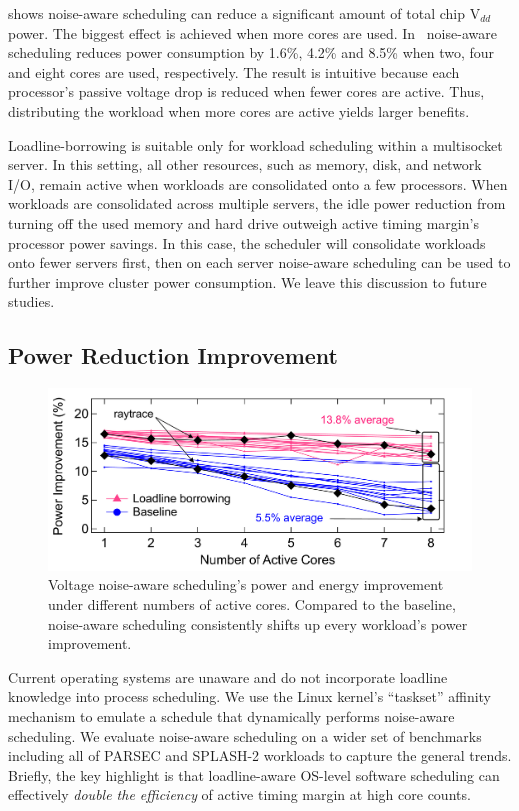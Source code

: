  shows noise-aware scheduling can reduce a significant amount of total chip V$_{dd}$ power. The biggest effect is achieved when more cores are used. In~ noise-aware scheduling reduces power consumption by 1.6\%, 4.2\% and 8.5\% when two, four and eight cores are used, respectively. The result is intuitive because each processor's passive voltage drop is reduced when fewer cores are active. Thus, distributing the workload when more cores are active yields larger benefits. 

Loadline-borrowing is suitable only for workload scheduling within a multisocket server. In this setting, all other resources, such as memory, disk, and network I/O, remain active when workloads are consolidated onto a few processors. When workloads are consolidated across multiple servers, the idle power reduction from turning off the used memory and hard drive outweigh active timing margin's processor power savings. In this case, the scheduler will consolidate workloads onto fewer servers first, then on each server noise-aware scheduling can be used to further improve cluster power consumption. We leave this discussion to future studies.

\subsection{Power Reduction Improvement}
\label{sec:voltage:opt:result}

\begin{figure}[t]
\centering
    \includegraphics[trim=0 0 0 0, clip,width=0.8\linewidth]{graphs/voltage/loadline-borrowing_scale.pdf}
    \caption{Voltage noise-aware scheduling's power and energy improvement under different numbers of active cores. Compared to the baseline, noise-aware scheduling consistently shifts up every workload's power improvement.}
    \label{fig:ll-borrow-scale}
    \vspace{-0.2cm}
\end{figure}

Current operating systems are unaware and do not incorporate loadline knowledge into process scheduling. We use the Linux kernel's ``taskset'' affinity mechanism to emulate a schedule that dynamically performs noise-aware scheduling. We evaluate noise-aware scheduling on a wider set of benchmarks including all of PARSEC and SPLASH-2 workloads to capture the general trends. Briefly, the key highlight is that loadline-aware OS-level software scheduling can effectively \emph{double the efficiency} of active timing margin at high core counts.

